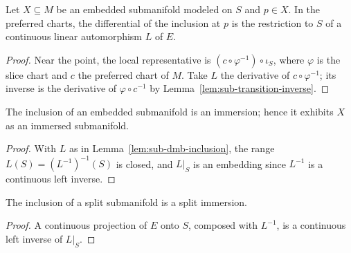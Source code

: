 \begin{lemma}
  \label{lem:sub-dmb-inclusion}
  \leanok
  Let $X \subseteq M$ be an embedded submanifold modeled on $S$ and $p \in X$. In the preferred
  charts, the differential of the inclusion at $p$ is the restriction to $S$ of a continuous
  linear automorphism $L$ of $E$.
\end{lemma}

\begin{proof}
  \leanok
  Near the point, the local representative is $(c \circ \varphi^{-1}) \circ \iota_S$, where
  $\varphi$ is the slice chart and $c$ the preferred chart of $M$. Take $L$ the derivative of
  $c \circ \varphi^{-1}$; its inverse is the derivative of $\varphi \circ c^{-1}$ by
  Lemma~\ref{lem:sub-transition-inverse}.
\end{proof}

\begin{theorem}
  \label{thm:sub-inclusion-immersion}
  \leanok
  The inclusion of an embedded submanifold is an immersion; hence it exhibits $X$ as an
  immersed submanifold.
\end{theorem}

\begin{proof}
  \leanok
  With $L$ as in Lemma~\ref{lem:sub-dmb-inclusion}, the range $L(S) = (L^{-1})^{-1}(S)$ is
  closed, and $L|_S$ is an embedding since $L^{-1}$ is a continuous left inverse.
\end{proof}

\begin{theorem}
  \label{thm:sub-inclusion-split}
  \leanok
  The inclusion of a split submanifold is a split immersion.
\end{theorem}

\begin{proof}
  \leanok
  A continuous projection of $E$ onto $S$, composed with $L^{-1}$, is a continuous left inverse
  of $L|_S$.
\end{proof}

